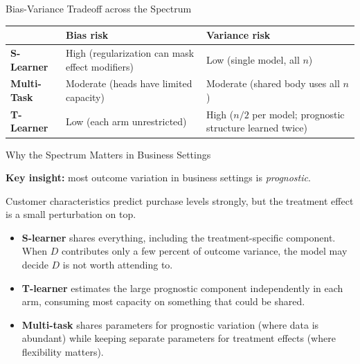 \documentclass[aspectratio=169, 11pt]{beamer}
\begin{document}
\begin{frame}{Bias-Variance Tradeoff across the Spectrum}
 
\begin{center}
\begin{tabular}{p{2.5cm}p{4.5cm}p{4.5cm}}
\toprule
& \textbf{Bias risk} & \textbf{Variance risk} \\
\midrule
\textbf{S-Learner} & High (regularization can mask effect modifiers) & Low (single model, all $n$) \\[0.8em]
\textbf{Multi-Task} & Moderate (heads have limited capacity) & Moderate (shared body uses all $n$) \\[0.8em]
\textbf{T-Learner} & Low (each arm unrestricted) & High ($n/2$ per model; prognostic structure learned twice) \\
\bottomrule
\end{tabular}
\end{center}
\end{frame}
 
\begin{frame}{Why the Spectrum Matters in Business Settings}
 
\textbf{Key insight:} most outcome variation in business settings is \emph{prognostic}.
 
\bigskip
 
Customer characteristics predict purchase levels strongly, but the treatment effect is a small perturbation on top.
 
\bigskip
 
\begin{itemize}
    \item \textbf{S-learner} shares everything, including the treatment-specific component. When $D$ contributes only a few percent of outcome variance, the model may decide $D$ is not worth attending to.
 
    \medskip
 
    \item \textbf{T-learner} estimates the large prognostic component independently in each arm, consuming most capacity on something that could be shared.
 
    \medskip
 
    \item \textbf{Multi-task} shares parameters for prognostic variation (where data is abundant) while keeping separate parameters for treatment effects (where flexibility matters).
\end{itemize}
\end{frame}
 
\end{document}
